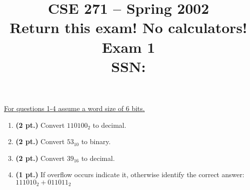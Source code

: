 \documentclass{article}
\begin{document}
\newcommand{\SOPmin}{${\rm SOP}_{\rm min} \ $}
\newcommand{\POSmin}{${\rm POS}_{\rm min} \ $}
\newcommand{\bs}{\backslash}


\title{
\Huge{CSE 271 -- Spring 2002}\\
\normalsize{Return this exam!  No calculators!}\\
\normalsize{Exam 1}\\
SSN:}
\date{}

\maketitle{}

\underline{For questions 1-4 assume a word size of 6 bits.}

\begin{enumerate}
\item {\bf (2 pt.)} Convert $110100_2$ to decimal.

\item {\bf (2 pt.)} Convert $53_{10}$ to binary.

\item {\bf (2 pt.)} Convert $39_{16}$ to decimal.
\pagebreak
\item {\bf (1 pt.)} If overflow occurs indicate it, otherwise identify
the correct answer: $111010_2 + 011011_2$


\end{enumerate}
\end{document}
